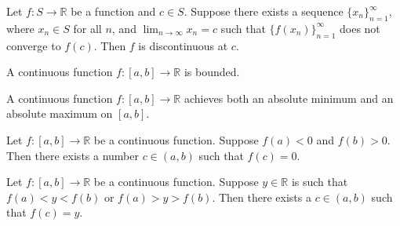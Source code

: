 \documentclass[../main.tex]{subfiles}
\begin{document}
    \begin{proposition}
        Let $f : S \to \mathbb{R}$ be a function and $c \in S$. Suppose there exists a sequence $\{x_n\}_{n=1}^{\infty}$, where $x_n \in S$ for all $n$, and $\lim_{n\to\infty} x_n = c$ such that $\{f(x_n)\}_{n=1}^{\infty}$ does not converge to $f(c)$. Then $f$ is discontinuous at $c$.
    \end{proposition}
        
    \begin{lemma}
        A continuous function $f : [a,b] \to \mathbb{R}$ is bounded.
    \end{lemma}
        
    \begin{theorem}
        A continuous function $f : [a,b] \to \mathbb{R}$ achieves both an absolute minimum and an absolute maximum on $[a,b]$.
    \end{theorem}
        
    \begin{lemma}
        Let $f : [a,b] \to \mathbb{R}$ be a continuous function. Suppose $f(a) < 0$ and $f(b) > 0$. Then there exists a number $c \in (a,b)$ such that $f(c) = 0$.
    \end{lemma}
        
    \begin{theorem}
        Let $f : [a,b] \to \mathbb{R}$ be a continuous function. Suppose $y \in \mathbb{R}$ is such that $f(a) < y < f(b)$ or $f(a) > y > f(b)$. Then there exists a $c \in (a,b)$ such that $f(c) = y$.
    \end{theorem}
        
    
\end{document}

